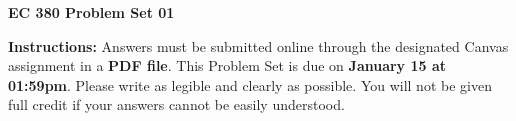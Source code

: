 \documentclass[12pt]{exam}
\newcommand{\examdate}{\fontfamily{lmss} \textbf{January 15 at 01:59pm}} %
\begin{document}
\selectfont

\begin{center}
    \textbf{{\LARGE EC 380 Problem Set 01}} \\
    \bigskip 
\end{center}

\noindent \textbf{Instructions:} 
Answers must be submitted online through the designated Canvas assignment in a \textbf{PDF file}.
This Problem Set is due on \examdate.
Please write as legible and clearly as possible. 
You will not be given full credit if your answers cannot be easily understood. 



\end{document}
